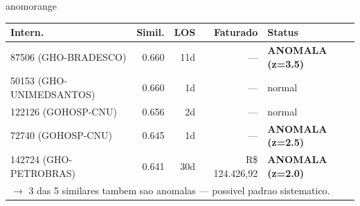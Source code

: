 \documentclass[a4paper,10pt]{article}
\begin{document}
\begin{anomalycard}[Internacao 3499 | GHO-AMIL | ALTO (z=4.12)]{anomorange}
\begin{tabular}{l r r r l}\toprule\textbf{Intern.} & \textbf{Simil.} & \textbf{LOS} & \textbf{Faturado} & \textbf{Status} \\\midrule
87506 (GHO-BRADESCO) & 0.660 & 11d & --- & \textcolor{anomred}{\textbf{ANOMALA (z=3.5)}} \\
50153 (GHO-UNIMEDSANTOS) & 0.660 & 1d & --- & \textcolor{jcubeblue}{normal} \\
122126 (GOHOSP-CNU) & 0.656 & 2d & --- & \textcolor{jcubeblue}{normal} \\
72740 (GOHOSP-CNU) & 0.645 & 1d & --- & \textcolor{anomred}{\textbf{ANOMALA (z=2.5)}} \\
142724 (GHO-PETROBRAS) & 0.641 & 30d & R\$ 124.426,92 & \textcolor{anomred}{\textbf{ANOMALA (z=2.0)}} \\
\multicolumn{5}{l}{\textcolor{anomred}{\small $\rightarrow$ 3 das 5 similares tambem sao anomalas --- possivel padrao sistematico.}} \\
\bottomrule\end{tabular}


\end{anomalycard}

\newpage
\end{document}
